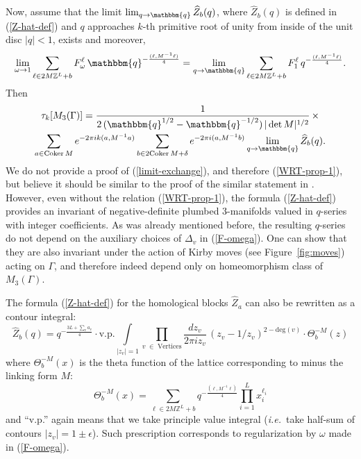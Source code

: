 \documentclass[hyper,letterpaper]{JHEP3}
\newcommand{\Z}{{\mathbb Z}}
\renewcommand{\hat}{\widehat}
\def\ie{{\textit{i.e.}}}
\def\q{{\mathbbm{q}}}
\begin{document}
{Now, assume that the limit $\lim_{q\rightarrow \q}\hat{Z}_b(q)$, where $\hat{Z}_b(q)$ is defined in (\ref{Z-hat-def}) and $q$ approaches $k$-th primitive root of unity from inside of the unit disc $|q|<1$, exists and moreover,
\begin{equation}
	\lim_{\omega\rightarrow 1}
	\sum_{\ell \in 2M\Z^L+b}F^\ell_\omega\,\q^{-\frac{(\ell,M^{-1}\ell)}{4}}
	=\lim_{q\rightarrow \q}
	\sum_{\ell \in 2M\Z^L+b}F^\ell_1\,q^{-\frac{(\ell,M^{-1}\ell)}{4}}.
	\label{limit-exchange}
\end{equation}
Then
\begin{multline}
 \tau_k[M_3(\Gamma)]=\frac{1}{2\,(\q^{1/2}-\q^{-1/2})\,|\det M|^{1/2}}
 \,\times\\
\sum_{a\in \mathrm{Coker}\,M}e^{-2\pi ik(a,M^{-1}a)}
\sum_{b \in 2\mathrm{Coker}\, M+\delta} e^{-2\pi i(a,M^{-1}b)}\lim_{q\rightarrow \q} \hat{Z}_b(q).
\label{WRT-prop-1}
\end{multline}
We do not provide a proof of (\ref{limit-exchange}), and therefore (\ref{WRT-prop-1}), but believe it should be similar to the proof of the similar statement in \cite{lawrence1999modular}. However, even without the relation (\ref{WRT-prop-1}), the formula (\ref{Z-hat-def}) provides an invariant of negative-definite plumbed 3-manifolds valued in $q$-series with integer coefficients. As was already mentioned before, the resulting $q$-series do not depend on the auxiliary choices of $\Delta_v$ in (\ref{F-omega}). One can show that they are also invariant under the action of Kirby moves (see Figure~\ref{fig:moves}) acting on $\Gamma$, and therefore indeed depend only on homeomorphism class of $M_3(\Gamma)$.

The formula (\ref{Z-hat-def}) for the homological blocks $\hat{Z}_a$ can also be rewritten as a contour integral:
\begin{equation}
	\hat{Z}_b(q)=q^{-\frac{3L+\sum_v a_{v}}{4}}\cdot\text{v.p.}\int\limits_{|z_v|=1}
\prod_{v\;\in\; \text{Vertices}}
\frac{dz_v}{2\pi iz_v}\,
\left({z_v-1/z_v}\right)^{2-\text{deg}(v)}\cdot\Theta^{-M}_b(z)
\end{equation}
where $\Theta^{-M}_b(x)$ is the theta function of the lattice corresponding to minus the linking form $M$:
\begin{equation}
	\Theta^{-M}_b(x)=\sum_{\ell \in 2M\Z^L+b}q^{-\frac{(\ell,M^{-1}\ell)}{4}}
	\prod_{i=1}^Lx_i^{\ell_i}
\end{equation}
and ``v.p.'' again means that we take principle value integral (\ie~take half-sum of contours $|z_v|=1\pm \epsilon$). Such prescription corresponds to regularization by $\omega$ made in (\ref{F-omega}).

}
\end{document}
